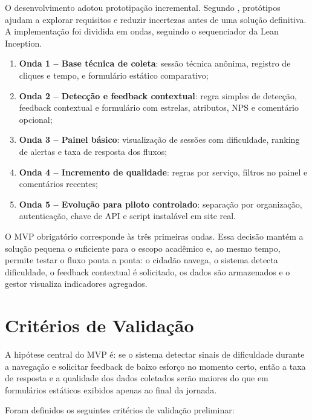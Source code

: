 O desenvolvimento adotou prototipação incremental. Segundo
, protótipos ajudam a explorar requisitos e reduzir
incertezas antes de uma solução definitiva. A implementação foi dividida em
ondas, seguindo o sequenciador da Lean Inception.

\begin{enumerate}
    \item \textbf{Onda 1 -- Base técnica de coleta}: sessão técnica anônima,
    registro de cliques e tempo, e formulário estático comparativo;
    \item \textbf{Onda 2 -- Detecção e feedback contextual}: regra simples de
    detecção, feedback contextual e formulário com estrelas, atributos, NPS e
    comentário opcional;
    \item \textbf{Onda 3 -- Painel básico}: visualização de sessões com
    dificuldade, ranking de alertas e taxa de resposta dos fluxos;
    \item \textbf{Onda 4 -- Incremento de qualidade}: regras por serviço, filtros
    no painel e comentários recentes;
    \item \textbf{Onda 5 -- Evolução para piloto controlado}: separação por
    organização, autenticação, chave de API e script instalável em site real.
\end{enumerate}

O MVP obrigatório corresponde às três primeiras ondas. Essa decisão mantém a
solução pequena o suficiente para o escopo acadêmico e, ao mesmo tempo, permite
testar o fluxo ponta a ponta: o cidadão navega, o sistema detecta dificuldade, o
feedback contextual é solicitado, os dados são armazenados e o gestor visualiza
indicadores agregados.

\section{Critérios de Validação}

A hipótese central do MVP é: se o sistema detectar sinais de dificuldade durante
a navegação e solicitar feedback de baixo esforço no momento certo, então a taxa
de resposta e a qualidade dos dados coletados serão maiores do que em formulários
estáticos exibidos apenas ao final da jornada.

Foram definidos os seguintes critérios de validação preliminar:

